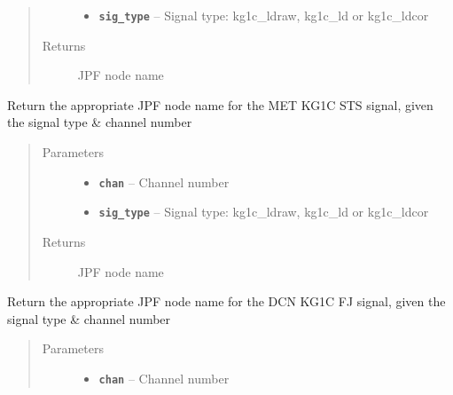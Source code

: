 \documentclass[letterpaper,10pt,english]{sphinxmanual}
\begin{document}
\begin{fulllineitems}
\begin{fulllineitems}
\begin{quote}
\begin{description}
\begin{itemize}
\item {} 
\textbf{\texttt{sig\_type}} -- Signal type: kg1c\_ldraw, kg1c\_ld or kg1c\_ldcor

\end{itemize}

\item[{Returns}] \leavevmode
JPF node name

\end{description}\end{quote}

\end{fulllineitems}


\begin{fulllineitems}
\label{consts:consts.Consts.get_sts_node_met}
Return the appropriate JPF node name for the MET KG1C STS signal, given the signal type \& channel number
\begin{quote}\begin{description}
\item[{Parameters}] \leavevmode\begin{itemize}
\item {} 
\textbf{\texttt{chan}} -- Channel number

\item {} 
\textbf{\texttt{sig\_type}} -- Signal type: kg1c\_ldraw, kg1c\_ld or kg1c\_ldcor

\end{itemize}

\item[{Returns}] \leavevmode
JPF node name

\end{description}\end{quote}

\end{fulllineitems}


\begin{fulllineitems}
\label{consts:consts.Consts.get_fj_node_dcn}
Return the appropriate JPF node name for the DCN KG1C FJ signal, given the signal type \& channel number
\begin{quote}\begin{description}
\item[{Parameters}] \leavevmode\begin{itemize}
\item {} 
\textbf{\texttt{chan}} -- Channel number


\end{itemize}
\end{description}
\end{quote}
\end{fulllineitems}
\end{fulllineitems}
\end{document}
